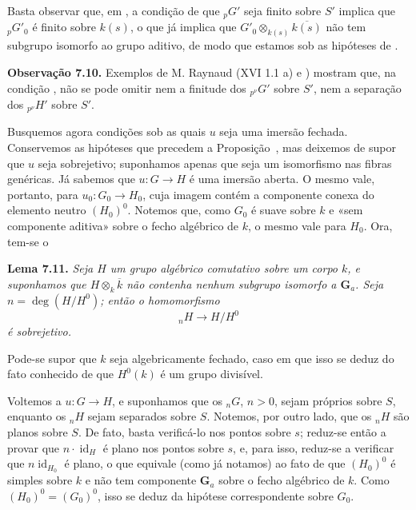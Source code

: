 Basta observar que, em ,
a condição de que \({}_pG'\) seja finito sobre \(S'\) implica que
\({}_pG'_0\) é finito sobre \(k(s)\), o que já implica que
\(G'_0\otimes_{k(s)}\overline{k(s)}\) não tem subgrupo isomorfo ao
grupo aditivo, de modo que estamos sob as hipóteses de
.

\medskip
\noindent{}\textbf{Observação 7.10.}
Exemplos de M. Raynaud (XVI 1.1 a) e
) mostram que, na
condição , não se pode
omitir nem a finitude dos \({}_{p^\nu}G'\) sobre \(S'\), nem a separação
dos \({}_{p^\nu}H'\) sobre \(S'\).

Busquemos agora condições sob as quais \(u\) seja uma imersão
fechada. Conservemos as hipóteses que precedem a
Proposição~, mas deixemos de
supor que \(u\) seja sobrejetivo; suponhamos apenas que seja um
isomorfismo nas fibras genéricas. Já sabemos que \(u:G\to H\) é uma
imersão aberta. O mesmo vale, portanto, para \(u_0:G_0\to H_0\), cuja
imagem contém a componente conexa do elemento neutro \((H_0)^0\).
Notemos que, como \(G_0\) é suave sobre \(k\) e «sem componente aditiva»
sobre o fecho algébrico de \(k\), o mesmo vale para \(H_0\). Ora, tem-se o

\medskip
\noindent{}\textbf{Lema 7.11.}
\textit{Seja \(H\) um grupo algébrico comutativo sobre um corpo \(k\), e
suponhamos que \(H\otimes_k\overline{k}\) não contenha nenhum subgrupo
isomorfo a \(\mathbf G_a\). Seja \(n=\deg(H/H^0)\); então o homomorfismo}
\[
  {}_nH\longrightarrow H/H^0
\]
\textit{é sobrejetivo.}

Pode-se supor que \(k\) seja algebricamente fechado, caso em que isso se
deduz do fato conhecido de que \(H^0(k)\) é um grupo divisível.

Voltemos a \(u:G\to H\), e suponhamos que os \({}_nG\), \(n>0\), sejam
próprios sobre \(S\), enquanto os \({}_nH\) sejam separados sobre \(S\).
Notemos, por outro lado, que os \({}_nH\) são planos sobre \(S\).
De fato, basta verificá-lo nos pontos sobre \(s\); reduz-se então a
provar que \(n\cdot\operatorname{id}_H\) é plano nos pontos sobre \(s\),
e, para isso, reduz-se a verificar que \(n\operatorname{id}_{H_0}\)
é plano, o que equivale (como já notamos) ao fato de que \((H_0)^0\)
é simples sobre \(k\) e não tem componente \(\mathbf G_a\) sobre o
fecho algébrico de \(k\). Como
\((H_0)^0=(G_0)^0\), isso se deduz da hipótese correspondente sobre
\(G_0\).

